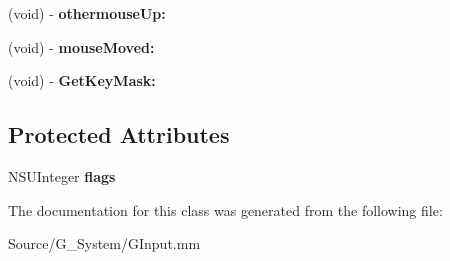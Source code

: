 \begin{DoxyCompactItemize}
\item 
(void) -\/ {\bfseries othermouse\+Up\+:}\hypertarget{interfaceGIResponder_a88e82a046893b9aab9f0776173ba6ee8}{}\label{interfaceGIResponder_a88e82a046893b9aab9f0776173ba6ee8}

\item 
(void) -\/ {\bfseries mouse\+Moved\+:}\hypertarget{interfaceGIResponder_a699c6208ac80a3c6d3c4abb222a03a10}{}\label{interfaceGIResponder_a699c6208ac80a3c6d3c4abb222a03a10}

\item 
(void) -\/ {\bfseries Get\+Key\+Mask\+:}\hypertarget{interfaceGIResponder_a060835ad8e859fca137acaee50593a47}{}\label{interfaceGIResponder_a060835ad8e859fca137acaee50593a47}

\end{DoxyCompactItemize}
\subsection*{Protected Attributes}
\begin{DoxyCompactItemize}
\item 
N\+S\+U\+Integer {\bfseries flags}\hypertarget{interfaceGIResponder_acbb29dd4a78a53d141da79b551fc82a5}{}\label{interfaceGIResponder_acbb29dd4a78a53d141da79b551fc82a5}

\end{DoxyCompactItemize}


The documentation for this class was generated from the following file\+:\begin{DoxyCompactItemize}
\item 
Source/\+G\+\_\+\+System/G\+Input.\+mm\end{DoxyCompactItemize}
